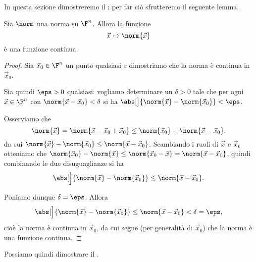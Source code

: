 In questa sezione dimostreremo il : per far ciò sfrutteremo il seguente lemma.
\begin{lemma}{}{}
    Sia $\norm$ una norma su $\F^n$. Allora la funzione \[
        \vec x \mapsto \norm{\vec x}
    \] è una funzione continua.
\end{lemma}
\begin{proof}
    Sia $\vec x_0 \in \F^n$ un punto qualsiasi e dimostriamo che la norma è continua in $\vec x_0$.

    Sia quindi $\eps > 0$ qualsiasi: vogliamo determinare un $\delta > 0$ tale che per ogni $\vec x \in \F^n$ con $\norm{\vec x - \vec x_0} < \delta$ si ha $\abs[\big]{\norm{\vec x} - \norm{\vec x_0}} < \eps$.

    Osserviamo che \[
        \norm{\vec x} = \norm{\vec x - \vec x_0 + \vec x_0} \leq \norm{\vec x_0} + \norm{\vec x - \vec x_0},
    \] da cui $\norm{\vec x} - \norm{\vec x_0} \leq \norm{\vec x - \vec x_0}$. Scambiando i ruoli di $\vec x$ e $\vec x_0$ otteniamo che $\norm{\vec x_0} - \norm{\vec x} \leq \norm{\vec x_0 - \vec x} = \norm{\vec x - \vec x_0}$, quindi combinando le due disuguaglianze si ha \[
        \abs[\Big]{\norm{\vec x} - \norm{\vec x_0}} \leq \norm{\vec x - \vec x_0}.
    \]
    
    Poniamo dunque $\delta = \eps$. Allora \[
        \abs[\Big]{\norm{\vec x} - \norm{\vec x_0}} \leq \norm{\vec x - \vec x_0} < \delta = \eps,
    \] cioè la norma è continua in $\vec x_0$, da cui segue (per generalità di $\vec x_0$) che la norma è una funzione continua.
\end{proof}

Possiamo quindi dimostrare il .
